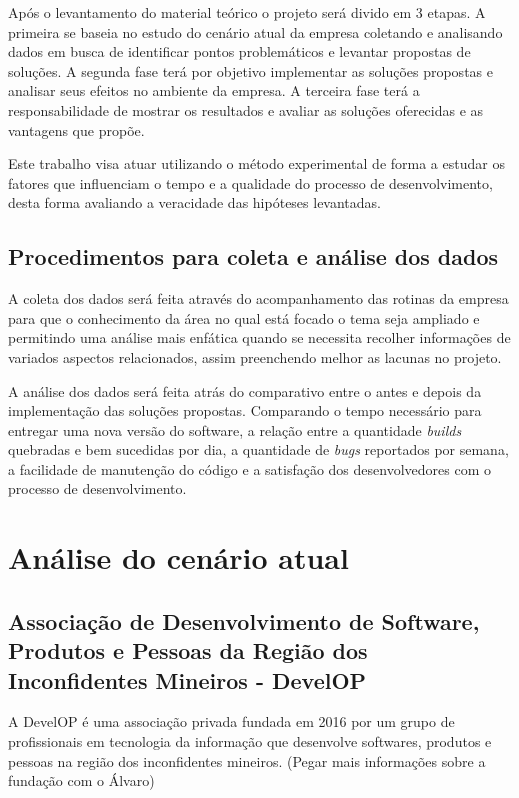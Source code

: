 \documentclass[
	12pt,				%
	openright,			%
	twoside,			%
	a4paper,			%
	english,			%
	french,				%
	spanish,			%
	brazil,				%
	]{abntex2}
\begin{document}
Após o levantamento do material teórico o projeto será divido em 3 etapas. A primeira se baseia no estudo do cenário atual da empresa coletando e analisando dados em busca de identificar pontos problemáticos e levantar propostas de soluções. A segunda fase terá por objetivo implementar as soluções propostas e analisar seus efeitos no ambiente da empresa. A terceira fase terá a responsabilidade de mostrar os resultados e avaliar as soluções oferecidas e as vantagens que propõe.

Este trabalho visa atuar utilizando o método experimental de forma a estudar os fatores que influenciam o tempo e a qualidade do processo de desenvolvimento, desta forma avaliando a veracidade das hipóteses levantadas.

\section{Procedimentos para coleta e análise dos dados}

A coleta dos dados será feita através do acompanhamento das rotinas da empresa para que o conhecimento da área no qual está focado o tema seja ampliado e permitindo uma análise mais enfática quando se necessita recolher informações de variados aspectos relacionados, assim preenchendo melhor as lacunas no projeto.

A análise dos dados será feita atrás do comparativo entre o antes e depois da implementação das soluções propostas. Comparando o tempo necessário para entregar uma nova versão do software, a relação entre a quantidade \textit{builds} quebradas e bem sucedidas por dia, a quantidade de  \textit{bugs} reportados por semana, a facilidade de manutenção do código e a satisfação dos desenvolvedores com o processo de desenvolvimento.


\chapter{Análise do cenário atual}

\section{Associação de Desenvolvimento de Software, Produtos e Pessoas da Região dos Inconfidentes Mineiros - DevelOP}

A DevelOP é uma associação privada fundada em 2016 por um grupo de profissionais em tecnologia da informação que desenvolve softwares, produtos e pessoas na região dos inconfidentes mineiros. (Pegar mais informações sobre a fundação com o Álvaro)
\end{document}
